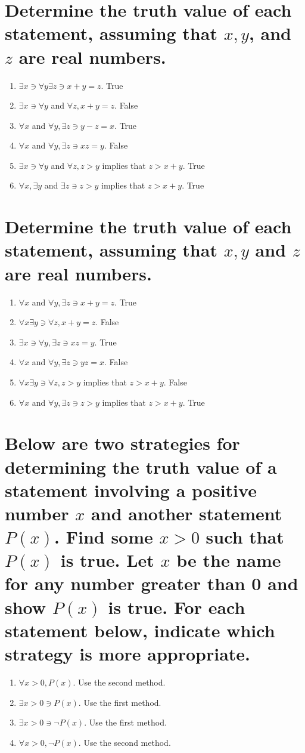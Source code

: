 \documentclass[11pt]{article} %
\begin{document}
\section{Determine the truth value of each statement, assuming that $x,y$, and $z$ are real numbers.}
\begin{enumerate}
\item $\exists x\ni\forall y \exists z\ni x+y=z$.
\subitem True
\item $\exists x \ni\forall y$ and $\forall z, x+y=z$.
\subitem False
\item $\forall x$ and $\forall y,\exists z \ni y-z=x$.
\subitem True
\item $\forall x$ and $\forall y,\exists z \ni xz=y$.
\subitem False
\item $\exists x \ni \forall y$ and $\forall z, z>y$ implies that $z>x+y$.
\subitem True
\item $\forall x, \exists y$ and $\exists z \ni z>y$ implies that $z>x+y$.
\subitem True
\end{enumerate}

\section{Determine the truth value of each statement, assuming that $x,y$ and $z$ are real numbers.}
\begin{enumerate}
\item $\forall x$ and $\forall y, \exists z \ni x+y=z$.
\subitem True
\item $\forall x \exists y \ni \forall z, x+y=z$.
\subitem False
\item $\exists x \ni \forall y, \exists z \ni xz=y$.
\subitem True
\item $\forall x$ and $\forall y, \exists z \ni yz=x$.
\subitem False
\item $\forall x \exists y \ni \forall z, z>y$ implies that $ z>x+y$.
\subitem False
\item $\forall x$ and $\forall y, \exists z \ni z>y$ implies that $z>x+y$.
\subitem True
\end{enumerate}

\section{Below are two strategies for determining the truth value of a statement involving a positive number $x$ and another statement $P(x)$.
Find some $x>0$ such that $P(x)$ is true.
Let $x$ be the name for any number greater than 0 and show $P(x)$ is true.
For each statement below, indicate which strategy is more appropriate.}
\begin{enumerate}
\item $\forall x>0, P(x)$.
\subitem Use the second method.
\item $\exists x>0 \ni P(x)$.
\subitem Use the first method.
\item $\exists x>0 \ni \neg P(x)$.
\subitem Use the first method.
\item $\forall x>0, \neg P(x)$.
\subitem Use the second method.
\end{enumerate}
\end{document}
